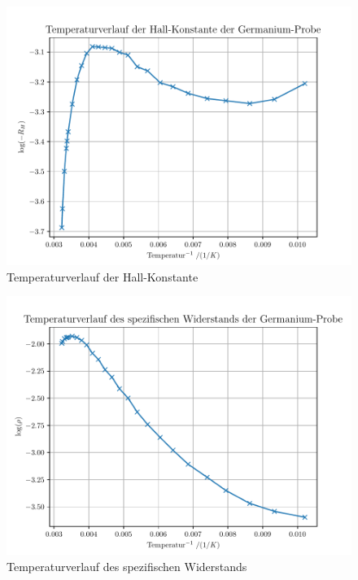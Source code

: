 \begin{figure}[htbp] 
     \includegraphics[scale=0.7]{temp_hall.pdf}
  \caption{Temperaturverlauf der Hall-Konstante}
  \label{hall}
\end{figure}

\begin{figure}[htbp] 
     \includegraphics[scale=0.7]{temp_rho.pdf}
  \caption{Temperaturverlauf des spezifischen Widerstands}
  \label{hall}
\end{figure}

